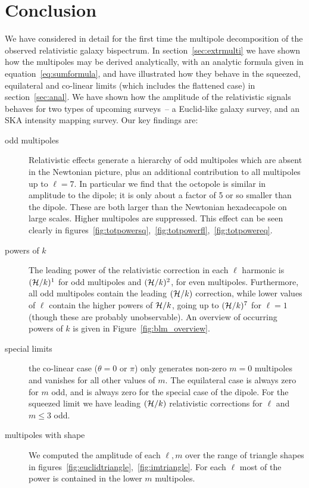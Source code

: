 {\section{Conclusion}\label{sec:concl}
%
We have considered in detail for the first time the multipole decomposition of the observed relativistic galaxy bispectrum. In section~\ref{sec:extrmulti} we have shown how the multipoles may be derived analytically, with an analytic formula given in equation~\eqref{eq:sumformula}, and have illustrated how they behave in the squeezed, equilateral and co-linear limits (which includes the flattened case) in section~\ref{sec:anal}. We have shown how the amplitude of the relativistic signals behaves for two types of upcoming surveys~-- a Euclid-like galaxy survey, and an SKA intensity mapping survey. Our key findings are:
\begin{description}
\item[odd multipoles] Relativistic effects generate a hierarchy of odd multipoles which are absent in the Newtonian picture, plus an additional contribution to all multipoles up to $\ell=7$. In particular we find that the octopole is similar in amplitude to the dipole; it is only about a factor of 5 or so smaller than the dipole. These are both larger than the Newtonian hexadecapole on large scales. Higher multipoles are suppressed. This effect can be seen clearly in figures~\ref{fig:totpowersq},~\ref{fig:totpowerfl},~\ref{fig:totpowereq}.
%
\item[powers of $k$] The leading power of the relativistic correction in each $\ell$ harmonic is $(\mathcal{H}/k)^1$ for odd multipoles and $(\mathcal{H}/k)^2$, for even multipoles. Furthermore, all odd multipoles contain the leading $(\mathcal{H}/k)$ correction, while lower values of \(\ell\) contain the higher powers of \(\mathcal{H}/k\), going up to \((\mathcal{H}/k)^7\) for \(\ell=1\) (though these are probably unobservable). An overview of occurring powers of \(k\) is given in Figure~\ref{fig:blm_overview}.
%
\item[special limits] the co-linear case ($\theta=0$ or $\pi$) only generates non-zero $m=0$ multipoles and vanishes for all other values of \(m\). The equilateral case is always zero for $m$ odd, and is always zero for the special case of the dipole. For the squeezed limit we have leading $(\mathcal{H}/k)$ relativistic corrections for $\ell$ and $m\leq3$ odd.
%
\item[multipoles with shape] We computed the amplitude of each $\ell,m$ over the range of triangle shapes in figures~\ref{fig:euclidtriangle},~\ref{fig:imtriangle}. For each $\ell$ most of the power is contained in the lower $m$ multipoles. 

\end{description}}
